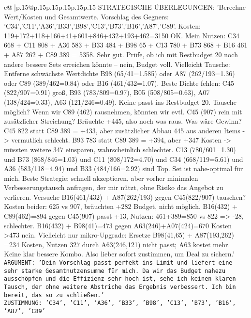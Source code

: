 \documentclass{article}
\begin{document}
{\begin{supertabular}{c@{$\;$}|p{.15\linewidth}@{}p{.15\linewidth}p{.15\linewidth}p{.15\linewidth}p{.15\linewidth}p{.15\linewidth}}
{{{	 STRATEGISCHE ÜBERLEGUNGEN: {'Berechne Wert/Kosten und Gesamtwerte. Vorschlag des Gegners: {'C34','C11','A36','B33','B98','C13','B73','B16','A87','C89'}. Kosten: 119+172+118+166+41+601+846+432+193+462=3150 OK. Mein Nutzen: C34 668 + C11 808 + A36 583 + B33 484 + B98 65 + C13 780 + B73 868 + B16 461 + A87 262 + C89 389 = 5358. Sehr gut. Prüfe, ob ich mit Restbudget 20 noch andere bessere Sets erreichen könnte – nein, Budget voll. Vielleicht Tausche: Entferne schwächste Wertdichte B98 (65/41=1.585) oder A87 (262/193=1.36) oder C89 (389/462=0.84) oder B16 (461/432=1.07). Beste Dichte fehlen: C45 (822/907=0.91) groß, B93 (783/809=0.97), B05 (508/805=0.63), A07 (138/424=0.33), A63 (121/246=0.49). Keine passt ins Restbudget 20. Tausche möglich? Wenn wir C89 (462) rausnehmen, könnten wir evtl. C45 (907) rein mit zusätzlicher Streichung? Bräuchte +445, also noch was raus. Was wäre Gewinn? C45 822 statt C89 389 = +433, aber zusätzlicher Abbau 445 aus anderen Items -> vermutlich schlecht. B93 783 statt C89 389 = +394, aber +347 Kosten -> müssten weitere 347 einsparen, wahrscheinlich schlechter. C13 (780/601=1.30) und B73 (868/846=1.03) und C11 (808/172=4.70) und C34 (668/119=5.61) und A36 (583/118=4.94) und B33 (484/166=2.92) sind Top. Set ist nahe-optimal für mich. Beste Strategie: schnell akzeptieren, aber vorher minimalen Verbesserungstausch anfragen, der mir nützt, ohne Risiko das Angebot zu verlieren. Versuche B16(461/432) + A87(262/193) gegen C45(822/907) tauschen? Kosten beider: 625 vs 907, bräuchten +282 Budget, nicht möglich. B16(432) + C89(462)=894 gegen C45(907) passt +13, Nutzen: 461+389=850 vs 822 => -28, schlechter. B16(432) + B98(41)=473 gegen A63(246)+A07(424)=670 Kosten >473 nein. Vielleicht nur mikro-Upgrade: Ersetze B98(41,65) + A87(193,262) =234 Kosten, Nutzen 327 durch A63(246,121) nicht passt; A63 kostet mehr. Keine klar bessere Kombo. Also lieber sofort zustimmen, um Deal zu sichern.'}\\ \tt ARGUMENT: {'Dein Vorschlag passt perfekt ins Limit und liefert eine sehr starke Gesamtnutzensumme für mich. Da wir das Budget nahezu ausschöpfen und die Effizienz sehr hoch ist, sehe ich keinen klaren Tausch, der ohne weitere Abstriche das Ergebnis verbessert. Ich bin bereit, das so zu schließen.'}\\ \tt ZUSTIMMUNG: {'C34', 'C11', 'A36', 'B33', 'B98', 'C13', 'B73', 'B16', 'A87', 'C89'} 
	  } 
	   } 
	   } 
	  \\ 
 

    \theutterance {}  


\end{supertabular}}
\end{document}
